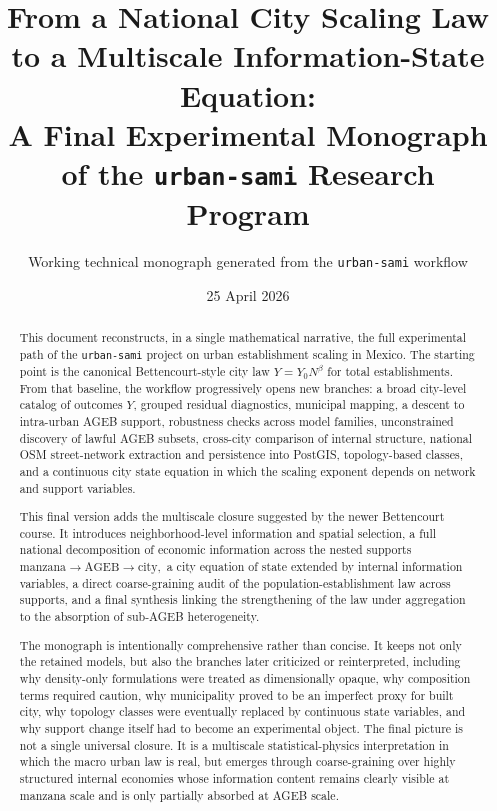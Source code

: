 \documentclass[11pt]{article}
\title{\textbf{From a National City Scaling Law to a Multiscale Information-State Equation:\\
A Final Experimental Monograph of the \texttt{urban-sami} Research Program}}
\author{Working technical monograph generated from the \texttt{urban-sami} workflow}
\date{25 April 2026}
\begin{document}
\maketitle

\begin{abstract}
This document reconstructs, in a single mathematical narrative, the full experimental path of the \texttt{urban-sami} project on urban establishment scaling in Mexico. The starting point is the canonical Bettencourt-style city law
\(
Y = Y_0 N^\beta
\)
for total establishments. From that baseline, the workflow progressively opens new branches: a broad city-level catalog of outcomes \(Y\), grouped residual diagnostics, municipal mapping, a descent to intra-urban AGEB support, robustness checks across model families, unconstrained discovery of lawful AGEB subsets, cross-city comparison of internal structure, national OSM street-network extraction and persistence into PostGIS, topology-based classes, and a continuous city state equation in which the scaling exponent depends on network and support variables.

This final version adds the multiscale closure suggested by the newer Bettencourt course. It introduces neighborhood-level information and spatial selection, a full national decomposition of economic information across the nested supports
\(
\text{manzana} \rightarrow \text{AGEB} \rightarrow \text{city},
\)
a city equation of state extended by internal information variables, a direct coarse-graining audit of the population-establishment law across supports, and a final synthesis linking the strengthening of the law under aggregation to the absorption of sub-AGEB heterogeneity.

The monograph is intentionally comprehensive rather than concise. It keeps not only the retained models, but also the branches later criticized or reinterpreted, including why density-only formulations were treated as dimensionally opaque, why composition terms required caution, why municipality proved to be an imperfect proxy for built city, why topology classes were eventually replaced by continuous state variables, and why support change itself had to become an experimental object. The final picture is not a single universal closure. It is a multiscale statistical-physics interpretation in which the macro urban law is real, but emerges through coarse-graining over highly structured internal economies whose information content remains clearly visible at manzana scale and is only partially absorbed at AGEB scale.
\end{abstract}
\end{document}
